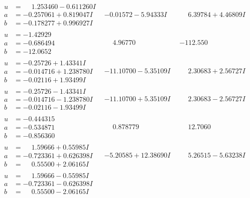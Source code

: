 \documentclass[1p]{elsarticle_modified}
\theoremstyle{definition}
\begin{document}
$$\begin{array}{c|c|c}
\begin{aligned}
u &= \phantom{-}1.253460 - 0.611260 I \\
a &= -0.257061 + 0.819047 I \\
b &= -0.178277 + 0.996927 I\end{aligned}
 & -0.01572 - 5.94333 I & \phantom{-}6.39784 + 4.46809 I \\ \hline\begin{aligned}
u &= -1.42929\phantom{ +0.000000I} \\
a &= -0.686494\phantom{ +0.000000I} \\
b &= -12.0652\phantom{ +0.000000I}\end{aligned}
 & \phantom{-}4.96770\phantom{ +0.000000I} & -112.550\phantom{ +0.000000I} \\ \hline\begin{aligned}
u &= -0.25726 + 1.43341 I \\
a &= -0.014716 + 1.238780 I \\
b &= -0.02116 + 1.93499 I\end{aligned}
 & -11.10700 - 5.35109 I & \phantom{-}2.30683 + 2.56727 I \\ \hline\begin{aligned}
u &= -0.25726 - 1.43341 I \\
a &= -0.014716 - 1.238780 I \\
b &= -0.02116 - 1.93499 I\end{aligned}
 & -11.10700 + 5.35109 I & \phantom{-}2.30683 - 2.56727 I \\ \hline\begin{aligned}
u &= -0.444315\phantom{ +0.000000I} \\
a &= -0.534871\phantom{ +0.000000I} \\
b &= -0.856360\phantom{ +0.000000I}\end{aligned}
 & \phantom{-}0.878779\phantom{ +0.000000I} & \phantom{-}12.7060\phantom{ +0.000000I} \\ \hline\begin{aligned}
u &= \phantom{-}1.59666 + 0.55985 I \\
a &= -0.723361 + 0.626398 I \\
b &= \phantom{-}0.55500 + 2.06165 I\end{aligned}
 & -5.20585 + 12.38690 I & \phantom{-}5.26515 - 5.63238 I \\ \hline\begin{aligned}
u &= \phantom{-}1.59666 - 0.55985 I \\
a &= -0.723361 - 0.626398 I \\
b &= \phantom{-}0.55500 - 2.06165 I\end{aligned}

\end{array}$$
\end{document}
